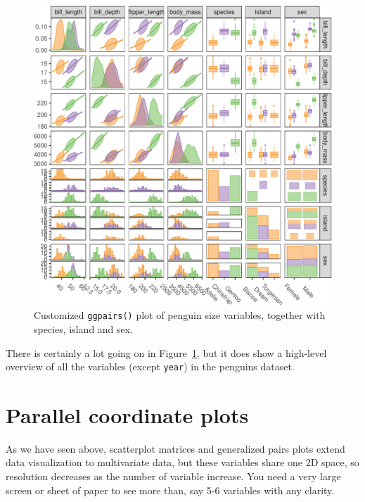 \documentclass[
  letterpaper,
  10pt,
  krantz2]{krantz}
\begin{document}
\begin{figure}[H]

{\centering \includegraphics[width=1\textwidth,height=\textheight]{figs/ch03/fig-peng-ggpairs7-1.pdf}

}

\caption{\label{fig-peng-ggpairs7}Customized \texttt{ggpairs()} plot of
penguin size variables, together with species, island and sex.}

\end{figure}

There is certainly a lot going on in Figure~\ref{fig-peng-ggpairs7}, but
it does show a high-level overview of all the variables (except
\texttt{year}) in the penguins dataset.

\hypertarget{sec-parcoord}{%
\section{Parallel coordinate plots}\label{sec-parcoord}}

As we have seen above, scatterplot matrices and generalized pairs plots
extend data visualization to multivariate data, but these variables
share one 2D space, so resolution decreases as the number of variable
increase. You need a very large screen or sheet of paper to see more
than, say 5-6 variables with any clarity.
\end{document}
